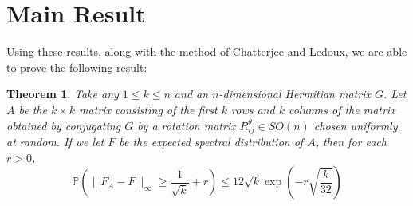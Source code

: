 \documentclass[12pt]{report}
\newtheorem{thm}{Theorem}[section]
\theoremstyle{definition}
\begin{document}
\section{Main Result}
Using these results, along with the method of Chatterjee and Ledoux, we are able to prove the following result:
\begin{thm}  Take any $1\leq k\leq n$ and an $n$-dimensional Hermitian matrix $G$.  Let $A$ be the $k\times k$ matrix consisting of the first $k$ rows and $k$ columns of the matrix obtained by conjugating $G$ by a rotation matrix $R^{\theta}_{ij}\in SO(n)$ chosen uniformly at random.  If we let $F$ be the expected spectral distribution of $A$, then for each $r>0$, 
\begin{equation*}
\mathbb{P}\left(\|F_A-F\|_{\infty}\geq \frac{1}{\sqrt{k}}+r\right)\leq 12\sqrt{k}\exp\left(-r\sqrt{\frac{k}{32}}\right)
\end{equation*}
\end{thm}
\end{document}

